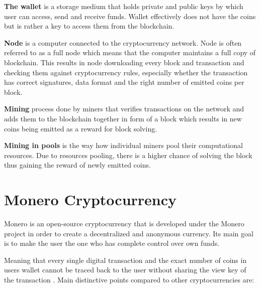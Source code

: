 \documentclass[
  printed, %
  table,   %
  nolof,     %
  nolot,     %
           oneside, color
]{fithesis3}
\begin{document}
\textbf{The wallet} is a storage medium that holds private and public keys by which user can access, send and receive funds. Wallet effectively does not have the coins but is rather a key to access them from the blockchain.

\textbf{Node} is a computer connected to the cryptocurrency network. Node is often referred to as a full node which means that the computer maintains a full copy of blockchain. This results in node downloading every block and transaction and checking them against cryptocurrency rules, especially whether the transaction has correct signatures, data format and the right number of emitted coins per block.

\textbf{Mining} process done by miners that verifies transactions on the network and adds them to the blockchain together in form of a block which results in new coins being emitted as a reward for block solving.

\textbf{Mining in pools} is the way how individual miners pool their computational resources. Due to resources pooling, there is a higher chance of solving the block thus gaining the reward of newly emitted coins. %

\chapter{Monero Cryptocurrency}

Monero is an open-source cryptocurrency that is developed under the Monero project in order to create a decentralized and anonymous currency. Its main goal is to make the user the one who has complete control over own funds.


Meaning that every single digital transaction and the exact number of coins in users wallet cannot be traced back to the user without sharing the view key of the transaction \cite{moneroprojectgithub}.  Main distinctive points compared to other cryptocurrencies are:
\end{document}
